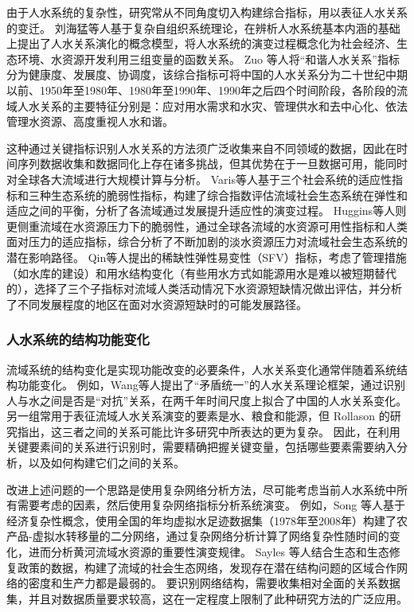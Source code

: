 由于人\textendash{}水系统的复杂性，研究常从不同角度切入构建综合指标，用以表征人\textendash{}水关系的变迁。
刘海猛等人基于复杂自组织系统理论，在辨析人\textendash{}水系统基本内涵的基础上提出了人\textendash{}水关系演化的概念模型，将人\textendash{}水系统的演变过程概念化为社会经济、生态环境、水资源开发利用三组变量的函数关系\cite{liu2014}。
Zuo 等人将“和谐人\textendash{}水关系”指标分为健康度、发展度、协调度\cite{zuo2008}，该综合指标可将中国的人\textendash{}水关系分为二十世纪中期以前、1950年至1980年、1980年至1990年、1990年之后四个时间阶段，各阶段的流域人\textendash{}水关系的主要特征分别是：应对用水需求和水灾、管理供水和去中心化、依法管理水资源、高度重视人水和谐\cite{zuo2016a}。

这种通过关键指标识别人\textendash{}水关系的方法须广泛收集来自不同领域的数据，因此在时间序列数据收集和数据同化上存在诸多挑战，但其优势在于一旦数据可用，能同时对全球各大流域进行大规模计算与分析。
Varis等人基于三个社会系统的适应性指标和三种生态系统的脆弱性指标，构建了综合指数评估流域社会\textendash{}生态系统在弹性和适应之间的平衡，分析了各流域通过发展提升适应性的演变过程\cite{varis2019}。
Huggins等人则更侧重流域在水资源压力下的脆弱性，通过全球各流域的水资源可用性指标和人类面对压力的适应指标，综合分析了不断加剧的淡水资源压力对流域社会\textendash{}生态系统的潜在影响路径\cite{huggins2022}。
Qin等人提出的稀缺性\textendash{}弹性\textendash{}易变性（SFV）指标，考虑了管理措施（如水库的建设）和用水结构变化（有些用水方式如能源用水是难以被短期替代的），选择了三个子指标对流域人类活动情况下水资源短缺情况做出评估，并分析了不同发展程度的地区在面对水资源短缺时的可能发展路径\cite{qin2019}。

\subsubsection{人\textendash{}水系统的结构功能变化}

流域系统的结构变化是实现功能改变的必要条件，人\textendash{}水关系变化通常伴随着系统结构功能变化。
例如，Wang等人提出了“矛盾统一”的人\textendash{}水关系理论框架，通过识别人与水之间是否是“对抗”关系，在两千年时间尺度上拟合了中国的人\textendash{}水关系变化\cite{wang2017}。
另一组常用于表征流域人\textendash{}水关系演变的要素是水、粮食和能源，但 Rollason 的研究指出，这三者之间的关系可能比许多研究中所表达的更为复杂\cite{rollason2021}。
因此，在利用关键要素间的关系进行识别时，需要精确把握关键变量，包括哪些要素需要纳入分析，以及如何构建它们之间的关系\cite{zhangzongyong2020, wang2021b}。

改进上述问题的一个思路是使用复杂网络分析方法，尽可能考虑当前人\textendash{}水系统中所有需要考虑的因素，然后使用复杂网络指标分析系统演变\cite{sayles2019, bodin2017b}。
例如，Song 等人基于经济复杂性概念，使用全国的年均虚拟水足迹数据集（1978年至2008年）构建了农产品-虚拟水转移量的二分网络，通过复杂网络分析计算了网络复杂性随时间的变化，进而分析黄河流域水资源的重要性演变规律\cite{song2022}。
Sayles 等人结合生态和生态修复政策的数据，构建了流域的社会\textendash{}生态网络，发现存在潜在结构问题的区域合作网络的密度和生产力都是最弱的\cite{sayles2017}。
要识别网络结构，需要收集相对全面的关系数据集，并且对数据质量要求较高，这在一定程度上限制了此种研究方法的广泛应用。

